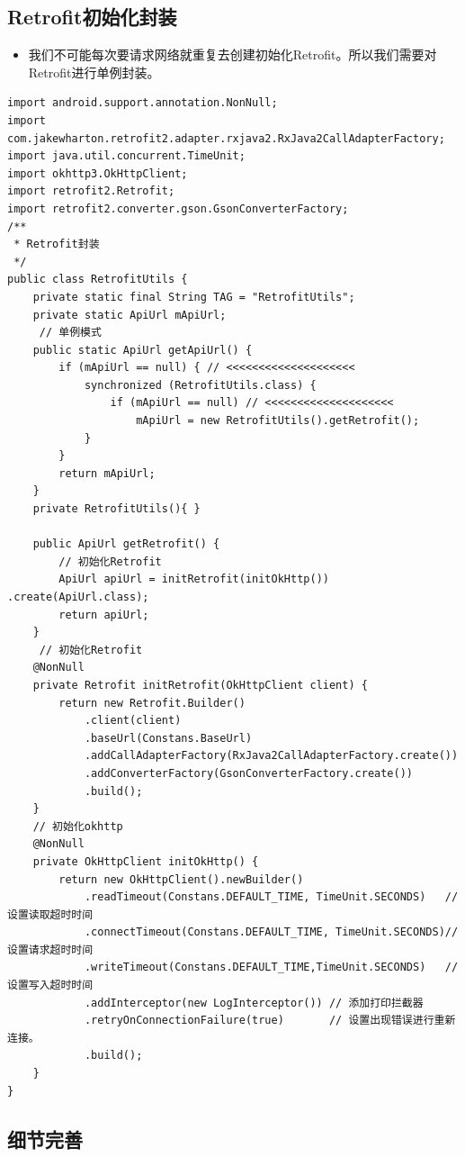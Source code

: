 \documentclass[9pt, b5paper]{article}
\begin{document}
\subsection{Retrofit初始化封装}
\label{sec-18-3}
\begin{itemize}
\item 我们不可能每次要请求网络就重复去创建初始化Retrofit。所以我们需要对Retrofit进行单例封装。
\end{itemize}
\begin{verbatim}
import android.support.annotation.NonNull;
import com.jakewharton.retrofit2.adapter.rxjava2.RxJava2CallAdapterFactory;
import java.util.concurrent.TimeUnit;
import okhttp3.OkHttpClient;
import retrofit2.Retrofit;
import retrofit2.converter.gson.GsonConverterFactory;
/**
 * Retrofit封装
 */
public class RetrofitUtils {
    private static final String TAG = "RetrofitUtils";
    private static ApiUrl mApiUrl;
     // 单例模式
    public static ApiUrl getApiUrl() {
        if (mApiUrl == null) { // <<<<<<<<<<<<<<<<<<<< 
            synchronized (RetrofitUtils.class) {
                if (mApiUrl == null) // <<<<<<<<<<<<<<<<<<<< 
                    mApiUrl = new RetrofitUtils().getRetrofit();
            }
        }
        return mApiUrl;
    }
    private RetrofitUtils(){ }

    public ApiUrl getRetrofit() {
        // 初始化Retrofit
        ApiUrl apiUrl = initRetrofit(initOkHttp()) .create(ApiUrl.class);
        return apiUrl;
    }
     // 初始化Retrofit
    @NonNull
    private Retrofit initRetrofit(OkHttpClient client) {
        return new Retrofit.Builder()
            .client(client)
            .baseUrl(Constans.BaseUrl)
            .addCallAdapterFactory(RxJava2CallAdapterFactory.create())
            .addConverterFactory(GsonConverterFactory.create())
            .build();
    }
    // 初始化okhttp
    @NonNull
    private OkHttpClient initOkHttp() {
        return new OkHttpClient().newBuilder()
            .readTimeout(Constans.DEFAULT_TIME, TimeUnit.SECONDS)   // 设置读取超时时间
            .connectTimeout(Constans.DEFAULT_TIME, TimeUnit.SECONDS)// 设置请求超时时间
            .writeTimeout(Constans.DEFAULT_TIME,TimeUnit.SECONDS)   // 设置写入超时时间
            .addInterceptor(new LogInterceptor()) // 添加打印拦截器
            .retryOnConnectionFailure(true)       // 设置出现错误进行重新连接。
            .build();
    }
}
\end{verbatim}
\subsection{细节完善}
\label{sec-18-4}
\end{document}
